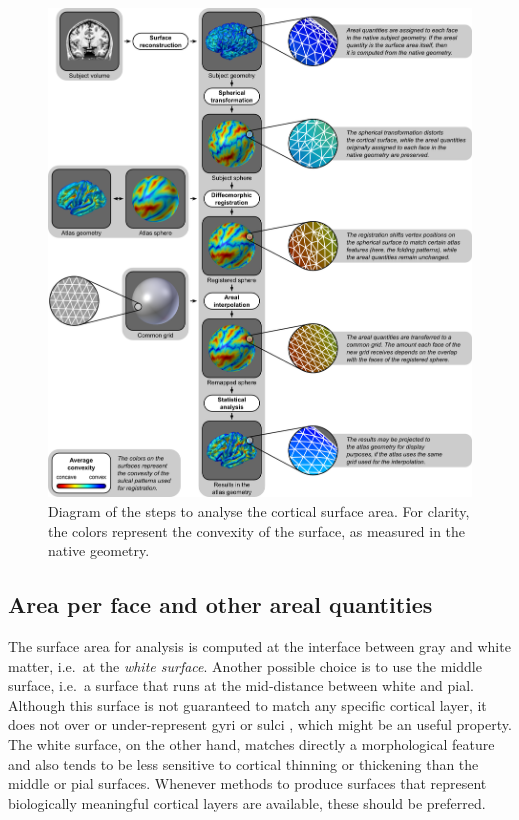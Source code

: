 \begin{figure}[!p]  %
\centering
\includegraphics[width=14cm]{images/overview.png}
\caption[Overview of areal analyses.]{Diagram of the steps to analyse the cortical surface area. For clarity, the colors represent the convexity of the surface, as measured in the native geometry.}
\label{fig:overview}
\end{figure}

\subsection{Area per face and other areal quantities}

The surface area for analysis is computed at the interface between gray and white matter, i.e.\ at the \emph{white surface}. Another possible choice is to use the middle surface, i.e.\ a surface that runs at the mid-distance between white and pial. Although this surface is not guaranteed to match any specific cortical layer, it does not over or under-represent gyri or sulci \citep{vanEssen2005}, which might be an useful property. The white surface, on the other hand, matches directly a morphological feature and also tends to be less sensitive to cortical thinning or thickening than the middle or pial surfaces. Whenever methods to produce surfaces that represent biologically meaningful cortical layers are available, these should be preferred.

